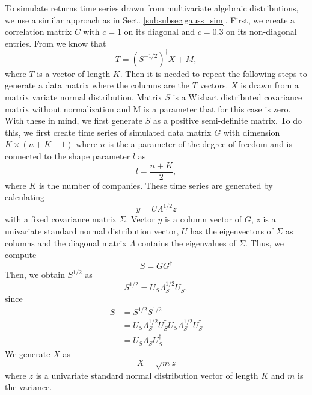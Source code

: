 To simulate returns time series drawn from multivariate algebraic
distributions, we use a similar approach as in Sect. \ref{subsubsec:gauss_sim}.
First, we create a correlation matrix $C$ with $c = 1$ on its diagonal and
$c = 0.3$ on its non-diagonal entries. From \cite{t_student_dist} we know that
\begin{equation}
    T = \left( S^{-1/2} \right)^{\dagger} X + M,
\end{equation}
where $T$ is a vector of length $K$. Then it is needed to repeat the following
steps to generate a data matrix where the columns are the $T$ vectors. $X$ is
drawn from a matrix variate normal distribution. Matrix $S$ is a Wishart
distributed covariance matrix without normalization and M is a parameter that
for this case is zero. With these in mind, we first generate $S$ as a
positive semi-definite matrix. To do this, we first create time series of
simulated data matrix $G$ with dimension $K \times \left(n + K - 1 \right)$
where $n$ is the a parameter of the degree of freedom and is connected to the
shape parameter $l$ as
\begin{equation}
    l = \frac{n + K}{2},
\end{equation}
where $K$ is the number of companies. These time series are generated by
calculating
\begin{equation}
    y = U \Lambda^{1/2} z
\end{equation}
with a fixed covariance matrix $\Sigma$. Vector $y$ is a column vector of $G$,
$z$ is a univariate standard normal distribution vector, $U$ has the
eigenvectors of $\Sigma$ as columns and the diagonal matrix $\Lambda$ contains
the eigenvalues of $\Sigma$. Thus, we compute
\begin{equation}
    S = G G^{\dagger}
\end{equation}
Then, we obtain $S^{1/2}$ as
\begin{equation}
    S^{1/2} = U_{S} \Lambda_{S}^{1/2} U_{S}^{\dagger},
\end{equation}
since
\begin{align}
    S &= S^{1/2} S^{1/2} \\
    &= U_{S} \Lambda_{S}^{1/2} U_{S}^{\dagger}
    U_{S} \Lambda_{S}^{1/2} U_{S}^{\dagger}\\
    &= U_{S} \Lambda_{S} U_{S}^{\dagger}
\end{align}
We generate $X$ as
\begin{equation}
    X = \sqrt{m} z
\end{equation}
where $z$ is a univariate standard normal distribution vector of length $K$ and
$m$ is the variance.

